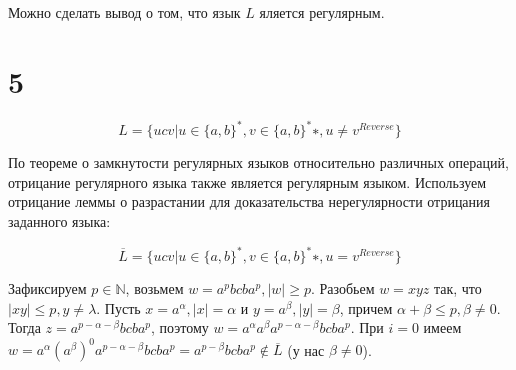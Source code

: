 \documentclass[a4paper, 12pt]{article}
\begin{document}
Можно сделать вывод о том, что язык $ L $ яляется регулярным.

\section*{5}
\[ L = \{ ucv | u \in \{a, b\}^*, v \in \{a, b\}^*∗, u \neq v^{Reverse}\}  \]

По теореме о замкнутости регулярных языков относительно различных операций, отрицание регулярного языка также является регулярным языком. Используем отрицание леммы о разрастании для доказательства нерегулярности отрицания заданного языка:

\[ \overline{L} = \{ ucv | u \in \{a, b\}^*, v \in \{a, b\}^*∗, u = v^{Reverse}\}  \]

Зафиксируем $ p \in \mathbb{N} $, возьмем $ w = a^pbcba^p, |w| \geq p $. Разобьем $ w = xyz $ так, что $ | xy | \leq p, y \neq \lambda $. Пусть $ x = a^{\alpha}, |x| = \alpha $ и $ y = a^{\beta}, |y| = \beta $, причем $ \alpha + \beta \leq p, \beta \neq 0 $. Тогда $ z = a^{p - \alpha - \beta}bcba^p $, поэтому $ w = a^{\alpha}a^{\beta}a^{p - \alpha - \beta}bcba^p $. При $ i = 0 $ имеем $ w = a^{\alpha}(a^{\beta})^0a^{p - \alpha - \beta}bcba^p = a^{p - \beta}bcba^p \notin \overline{L} $ (у нас $ \beta \neq 0 $).
\end{document}
